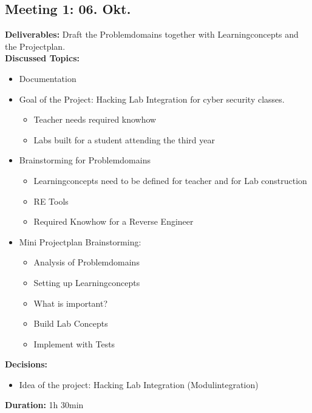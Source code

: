 \subsection*{Meeting 1: 06. Okt.}
\textbf{Deliverables:} Draft the Problemdomains together with Learningconcepts and the Projectplan. \\
\textbf{Discussed Topics:} 
\begin{itemize}
    \item Documentation
    \item Goal of the Project: Hacking Lab Integration for cyber security classes.
    \begin{itemize}
        \item Teacher needs required knowhow
        \item Labs built for a student attending the third year
    \end{itemize}
    \item Brainstorming for Problemdomains
    \begin{itemize}
        \item Learningconcepts need to be defined for teacher and for Lab construction
        \item RE Tools
        \item Required Knowhow for a Reverse Engineer
    \end{itemize}
    \item Mini Projectplan Brainstorming:
    \begin{itemize}
        \item Analysis of Problemdomains
        \item Setting up Learningconcepts
        \item What is important?
        \item Build Lab Concepts
        \item Implement with Tests
    \end{itemize}
\end{itemize}
\textbf{Decisions:} 
\begin{itemize}
    \item Idea of the project: Hacking Lab Integration (Modulintegration)
\end{itemize}
\textbf{Duration:} 1h 30min

\newpage
